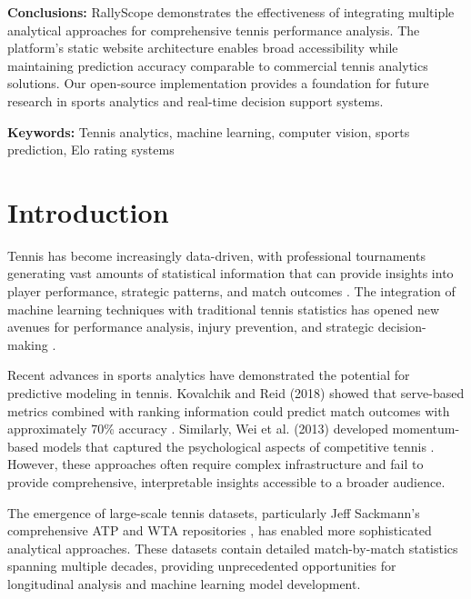 \documentclass[11pt,a4paper]{article}
\begin{document}
\begin{titlepage}
\begin{minipage}{0.8\textwidth}
\textbf{Conclusions:} RallyScope demonstrates the effectiveness of integrating multiple analytical approaches for comprehensive tennis performance analysis. The platform's static website architecture enables broad accessibility while maintaining prediction accuracy comparable to commercial tennis analytics solutions. Our open-source implementation provides a foundation for future research in sports analytics and real-time decision support systems.

\textbf{Keywords:} Tennis analytics, machine learning, computer vision, sports prediction, Elo rating systems
\end{minipage}

\end{titlepage}

\section{Introduction}

Tennis has become increasingly data-driven, with professional tournaments generating vast amounts of statistical information that can provide insights into player performance, strategic patterns, and match outcomes \citep{kovalchik2020extension, sipko2015machine}. The integration of machine learning techniques with traditional tennis statistics has opened new avenues for performance analysis, injury prevention, and strategic decision-making \citep{reid2016matchplay, cross2009grand}.

Recent advances in sports analytics have demonstrated the potential for predictive modeling in tennis. Kovalchik and Reid (2018) showed that serve-based metrics combined with ranking information could predict match outcomes with approximately 70\% accuracy \citep{kovalchik2018calibration}. Similarly, Wei et al. (2013) developed momentum-based models that captured the psychological aspects of competitive tennis \citep{wei2013predicting}. However, these approaches often require complex infrastructure and fail to provide comprehensive, interpretable insights accessible to a broader audience.

The emergence of large-scale tennis datasets, particularly Jeff Sackmann's comprehensive ATP and WTA repositories \citep{sackmann2024tennis}, has enabled more sophisticated analytical approaches. These datasets contain detailed match-by-match statistics spanning multiple decades, providing unprecedented opportunities for longitudinal analysis and machine learning model development.
\end{document}
